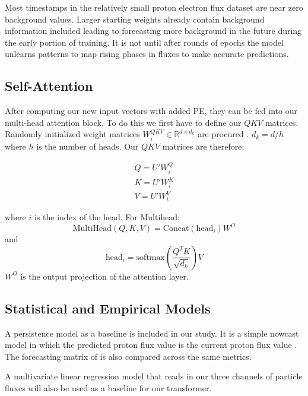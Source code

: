 Most timestamps in the relatively small proton electron flux dataset are near zero background values.
Larger starting weights already contain background information included leading to forecasting more background in the future during the early portion of training.
It is not until after rounds of epochs the model unlearns patterns to map rising phases in fluxes to make accurate predictions.

\subsection{Self-Attention}
After computing our new input vectors with added PE, they can be fed into our multi-head attention block.
To do this we first have to define our $QKV$ matrices. Randomly initialized weight matrices $W_i^{QKV} \in \mathbb{R}^{d \times d_k}$ are procured \cite{vaswani2017attention}.
$d_k  =d/h$ where $h$ is the number of heads. Our $QKV$ matrices are therefore:

\begin{align*}
    Q = U'W_i^Q\\
    K = U' W_i^K\\
    V = U'W_i^V
\end{align*}

where $i$ is the index of the head. For Multihead:
$$
\text{MultiHead}(Q,K,V) = \text{Concat}(\text{head}_i)W^O
$$
and
$$
\text{head}_i = \text{softmax}\left(\frac{Q^TK}{\sqrt{d_k}}\right)V
$$
$W^O$ is the output projection of the attention layer.
\label{sec:self-attention}

\subsection{Statistical and Empirical Models}
\label{sec: baseline_methods_used_for_comparison}
A persistence model as a baseline is included in our study. It is a simple nowcast model in which the predicted proton flux value is the current proton flux value \cite{zeng2022transformers}.
The forecasting matrix of  is also compared across the same metrics.

A multivariate linear regression model that reads in  our three channels of particle fluxes will also be used as a baseline for our transformer.
